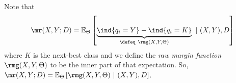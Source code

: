 \documentclass[
	twoside=false, %
]{kaobook}
\begin{document}

Note that
$$
\mr(X, Y;D) = \mathbb{E}_{\Theta}\left[ 
\underbrace{
\ind{q_{i}=Y} - \ind{q_{i}=K} 
}_{
\defeq ~\rmg(X, Y, \Theta) 
}
~|~(X,Y), D \right] 
$$
where $K$ is the next-best class and we define the \textit{raw margin function} $\rmg(X, Y, \Theta)$ to be the inner part of that expectation. So, 
$\mr(X, Y;D) = \mathbb{E}_{\Theta}\left[ 
\rmg(X, Y, \Theta) 
~|~(X,Y), D \right]$. 
\end{document}
